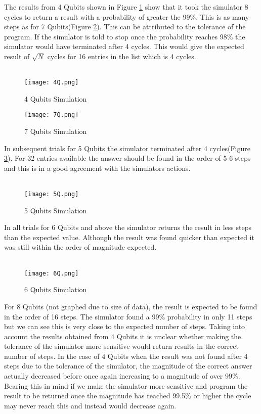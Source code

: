 \documentclass[12pt]{report}
\begin{document}
The results from 4 Qubits shown in Figure \ref{fig:4Q} show that it took the simulator 8 cycles to return a result
with a probability of greater the 99\%. This is as many steps as for 7 Qubits(Figure \ref{fig:7Q}). This can be attributed to
the tolerance of the program. If the simulator is told to stop once the probability reaches 98\% the
simulator would have terminated after 4 cycles. This would give the expected result of $\sqrt{N}$ cycles
for 16 entries in the list which is 4 cycles. \\ \\
\begin{figure} [H]
\texttt{[image: 4Q.png]}
\caption{4 Qubits Simulation}
\label{fig:4Q}
\end{figure}
\begin{figure} [H]
\texttt{[image: 7Q.png]}
\caption{7 Qubits Simulation}
\label{fig:7Q}
\end{figure}
In subsequent trials for 5 Qubits the simulator
terminated after 4 cycles(Figure \ref{fig:5Q}). For 32 entries available the answer should be found in the order of 5-6
steps and this is in a good agreement with the simulators actions. \\ \\ 
\begin{figure} [H]
\texttt{[image: 5Q.png]}
\caption{5 Qubits Simulation}
\label{fig:5Q}
\end{figure}
In all trials for 6 Qubits and above the simulator
returns the result in less steps than the expected value. Although the result was found quicker than
expected it was still within the order of magnitude expected. \\ \\ 
\begin{figure} [H]
\texttt{[image: 6Q.png]}
\caption{6 Qubits Simulation}
\label{fig:6Q}
\end{figure} 
For 8 Qubits (not graphed due to size
of data), the result is expected to be found in the order of 16 steps. The simulator found a 99\%
probability in only 11 steps but we can see this is very close to the expected number of steps. Taking
into account the results obtained from 4 Qubits it is unclear whether making the tolerance of the
simulator more sensitive would return results in the correct number of steps. In the case of 4 Qubits
when the result was not found after 4 steps due to the tolerance of the simulator, the magnitude of
the correct answer actually decreased before once again increasing to a magnitude of over 99\%.
Bearing this in mind if we make the simulator more sensitive and program the result to be returned
once the magnitude has reached 99.5\% or higher the cycle may never reach this and instead would
decrease again. 
\end{document}
